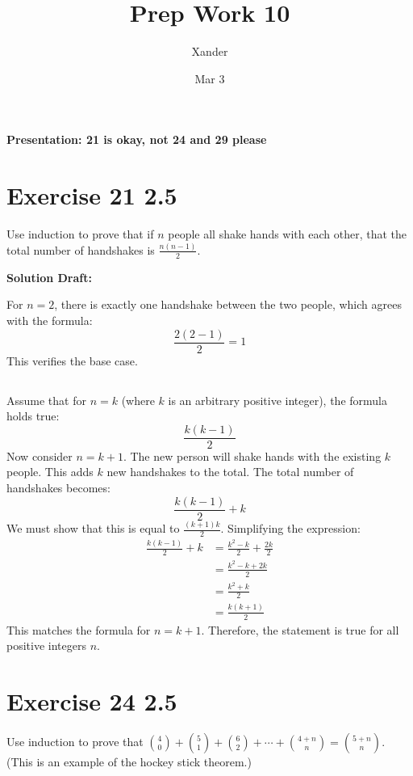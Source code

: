 \documentclass{article}
\title{Prep Work 10}
\author{Xander}
\date{Mar 3}
\begin{document}
\maketitle
\noindent\textbf{Presentation: 21 is okay, not 24 and 29 please} 

\section*{Exercise 21 2.5}  

Use induction to prove that if \( n \) people all shake hands with each other, that the total number of handshakes is \( \frac{n(n-1)}{2} \).

\vspace{0.5cm}
\noindent\textbf{Solution Draft:} 
\vspace{0.2cm}

For \( n = 2 \), there is exactly one handshake between the two people, which agrees with the formula:
\[ \frac{2(2-1)}{2} = 1 \]
This verifies the base case.

\subsection*{}
Assume that for \( n = k \) (where \( k \) is an arbitrary positive integer), the formula holds true:
\[ \frac{k(k-1)}{2} \]
Now consider \( n = k + 1 \). The new person will shake hands with the existing \( k \) people. This adds \( k \) new handshakes to the total. The total number of handshakes becomes:
\[ \frac{k(k-1)}{2} + k \]
We must show that this is equal to \( \frac{(k+1)k}{2} \). Simplifying the expression:
\begin{align*}
\frac{k(k-1)}{2} + k &= \frac{k^2 - k}{2} + \frac{2k}{2} \\
&= \frac{k^2 - k + 2k}{2} \\
&= \frac{k^2 + k}{2} \\
&= \frac{k(k+1)}{2}
\end{align*}
This matches the formula for \( n = k + 1 \). Therefore, the statement is true for all positive integers \( n \).


\section*{Exercise 24 2.5}  

Use induction to prove that \( {4 \choose 0} + {5 \choose 1} + {6 \choose 2} + \cdots + {4+n \choose n} = {5+n \choose n} \). (This is an example of the hockey stick theorem.)
\end{document}
